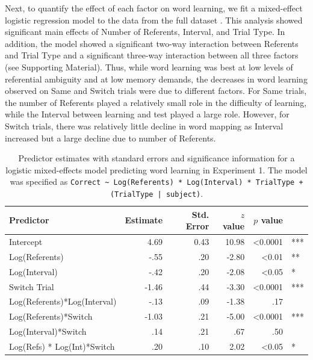 \documentclass[man,floatsintext]{apa6}
\begin{document}
Next, to quantify the effect of each factor on word learning, we fit a mixed-effect logistic regression model to the data from the full dataset \cite{Baayen2008}. This analysis showed significant main effects of Number of Referents, Interval, and Trial Type. In addition, the model showed a significant two-way interaction between Referents and Trial Type and a significant three-way interaction between all three factors (see Supporting Material). Thus, while word learning was best at low levels of referential ambiguity and at low memory demands, the decreases in word learning observed on Same and Switch trials were due to different factors. For Same trials, the number of Referents played a relatively small role in the difficulty of learning, while the Interval between learning and test played a large role. However, for Switch trials, there was relatively little decline in word mapping as Interval increased but a large decline due to number of Referents. 

\begin{table}
\begin{center}
\begin{tabular}{lrrrrl}
\hline
Predictor & Estimate & Std. Error & $z$ value & $p$ value & \\
\hline
Intercept & 4.69 & 0.43  & 10.98 &  <0.0001 & ***  \\
Log(Referents)  & -.55 & .20  & -2.80 &  <0.01 & **   \\
Log(Interval)  & -.42 & .20  & -2.08 &  <0.05 & *  \\
Switch Trial  & -1.46 & .44  & -3.30 &  <0.0001 & ***   \\
Log(Referents)*Log(Interval)  & -.13 & .09 & -1.38 &  .17 &  \\
Log(Referents)*Switch  & -1.03 & .21 & -5.00 &  <0.0001 & ***   \\
Log(Interval)*Switch  & .14 & .21  & .67 &  .50 &  \\
Log(Refs) * Log(Int)*Switch  & .20 & .10  & 2.02 &  <0.05 & *  \\
\hline
\end{tabular}
\end{center}
\caption{\label{tab:exp1_reg}Predictor estimates with standard errors and significance information for a logistic mixed-effects model predicting word learning in Experiment 1. The model was specified as \small{\tt{Correct \textasciitilde \hspace{1pt} Log(Referents) * Log(Interval) * TrialType + (TrialType | subject)}}.}
\end{table}
\end{document}
